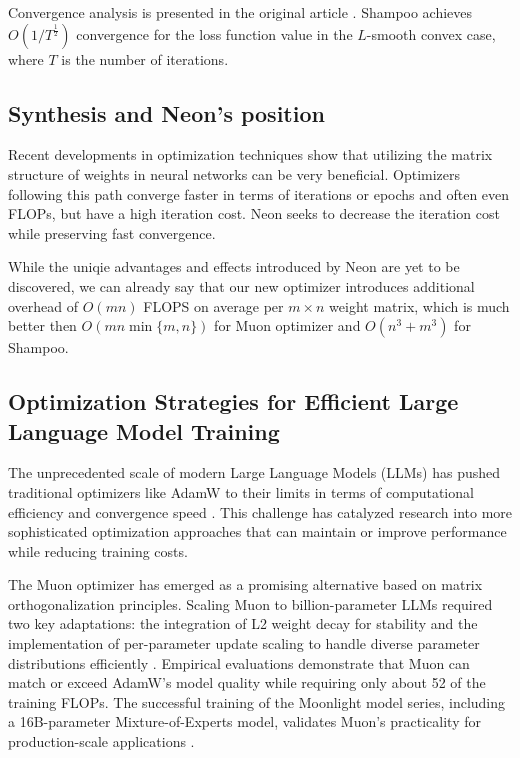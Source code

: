 \documentclass{article} %
\begin{document}
Convergence analysis is presented in the original article \cite{gupta2018shampoopreconditionedstochastictensor}. Shampoo achieves $O(1/T^{\frac{1}{2}})$ convergence for the loss function value in the $L$-smooth convex case, where $T$ is the number of iterations.

\subsection{Synthesis and Neon's position}

Recent developments in optimization techniques show that utilizing the matrix structure of weights in neural networks can be very beneficial. Optimizers following this path converge faster in terms of iterations or epochs and often even FLOPs, but have a high iteration cost. Neon seeks to decrease the iteration cost while preserving fast convergence.

While the uniqie advantages and effects introduced by Neon are yet to be discovered, we can already say that our new optimizer introduces additional overhead of $O(mn)$ FLOPS on average per $m \times n$ weight matrix, which is much better then $O(m n \min\{m, n\})$ for Muon optimizer and $O(n^3 + m^3)$ for Shampoo. 

\subsection{Optimization Strategies for Efficient Large Language Model Training}
The unprecedented scale of modern Large Language Models (LLMs) has pushed traditional optimizers like AdamW \cite{Loshchilov2017FixingWD} to their limits in terms of computational efficiency and convergence speed \cite{liu2025muon,chen2025cosmoshybridadaptive}. This challenge has catalyzed research into more sophisticated optimization approaches that can maintain or improve performance while reducing training costs.

The Muon optimizer  has emerged as a promising alternative based on matrix orthogonalization principles. Scaling Muon to billion-parameter LLMs required two key adaptations: the integration of L2 weight decay for stability and the implementation of per-parameter update scaling to handle diverse parameter distributions efficiently . Empirical evaluations demonstrate that Muon can match or exceed AdamW's model quality while requiring only about 52 of the training FLOPs. The successful training of the Moonlight model series, including a 16B-parameter Mixture-of-Experts model, validates Muon's practicality for production-scale applications \cite{liu2025muon}.
\end{document}
